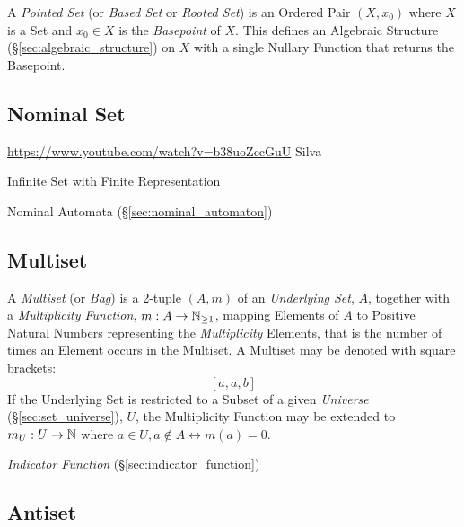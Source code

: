 A \emph{Pointed Set} (or \emph{Based Set} or \emph{Rooted Set}) is an Ordered
Pair $(X, x_0)$ where $X$ is a Set and $x_0 \in X$ is the \emph{Basepoint} of
$X$. This defines an Algebraic Structure (\S\ref{sec:algebraic_structure}) on
$X$ with a single Nullary Function that returns the Basepoint.



\subsection{Nominal Set}\label{sec:nominal_set}

\url{https://www.youtube.com/watch?v=b38uoZccGuU} Silva

Infinite Set with Finite Representation

Nominal Automata (\S\ref{sec:nominal_automaton})



\subsection{Multiset}\label{sec:multiset}

A \emph{Multiset} (or \emph{Bag}) is a 2-tuple $(A,m)$ of an
\emph{Underlying Set}, $A$, together with a \emph{Multiplicity
  Function}, $m : A \to \mathbb{N}_{\geq 1}$, mapping Elements
of $A$ to Positive Natural Numbers representing the
\emph{Multiplicity} Elements, that is the number of times an Element
occurs in the Multiset. A Multiset may be denoted with square
brackets:
\[
  [a,a,b]
\]
If the Underlying Set is restricted to a Subset of a given
\emph{Universe} (\S\ref{sec:set_universe}), $U$, the Multiplicity
Function may be extended to $m_U : U \to \mathbb{N}$ where $a \in
U, a \notin A \leftrightarrow m(a)=0$.

\emph{Indicator Function} (\S\ref{sec:indicator_function})



\subsection{Antiset}\label{sec:antiset}

